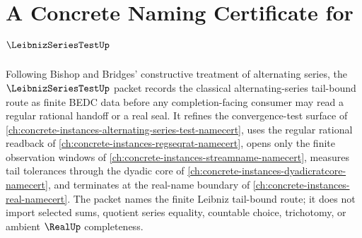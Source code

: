 \chapter{A Concrete Naming Certificate for $\LeibnizSeriesTestUp$}
\label{ch:concrete-instances-leibniz-series-test-namecert}

Following Bishop and Bridges' constructive treatment of alternating series, the $\LeibnizSeriesTestUp$ packet records the classical alternating-series tail-bound route as finite BEDC data before any completion-facing consumer may read a regular rational handoff or a real seal. It refines the convergence-test surface of \autoref{ch:concrete-instances-alternating-series-test-namecert}, uses the regular rational readback of \autoref{ch:concrete-instances-regseqrat-namecert}, opens only the finite observation windows of \autoref{ch:concrete-instances-streamname-namecert}, measures tail tolerances through the dyadic core of \autoref{ch:concrete-instances-dyadicratcore-namecert}, and terminates at the real-name boundary of \autoref{ch:concrete-instances-real-namecert}. The packet names the finite Leibniz tail-bound route; it does not import selected sums, quotient series equality, countable choice, trichotomy, or ambient $\RealUp$ completeness.

